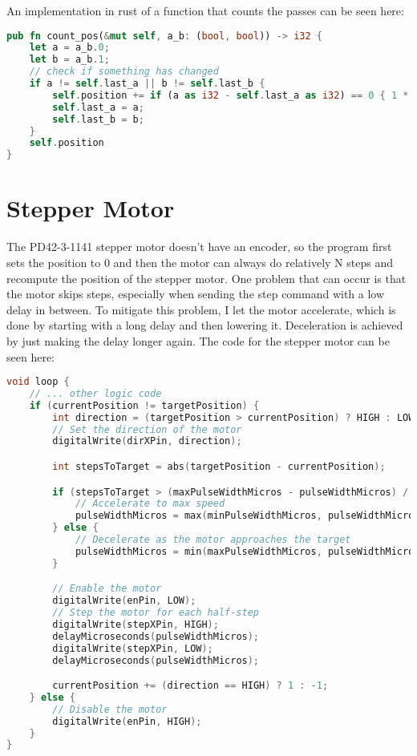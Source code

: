 An implementation in rust of a function that counts the passes can be seen here:
\begin{lstlisting}[language=rust,breaklines,label={lst:dc-motor}]
pub fn count_pos(&mut self, a_b: (bool, bool)) -> i32 {
    let a = a_b.0;
    let b = a_b.1;
    // check if something has changed
    if a != self.last_a || b != self.last_b {
        self.position += if (a as i32 - self.last_a as i32) == 0 { 1 * if a { 1 } else { -1 } * if (b as i32 - self.last_b as i32) == 1 { 1 } else { -1 } } else { - (1 * if b { 1 } else { -1 } * (a as i32 - self.last_a as i32))};
        self.last_a = a;
        self.last_b = b;
    }
    self.position
}

\end{lstlisting}


\section{Stepper Motor}\label{sec:stepper-motor}
The PD42-3-1141 stepper motor doesn't have an encoder, so the program first sets the position to 0 and then the motor can always do relatively N steps and recompute the position of the stepper motor.
One problem that can occur is that the motor skips steps, especially when sending the step command with a low delay in between.
To mitigate this problem, I let the motor accelerate, which is done by starting with a long delay and then lowering it.
Deceleration is achieved by just making the delay longer again.
The code for the stepper motor can be seen here:
\begin{lstlisting}[language=cpp,breaklines,label={lst:stepper-motor}]
void loop {
    // ... other logic code
    if (currentPosition != targetPosition) {
        int direction = (targetPosition > currentPosition) ? HIGH : LOW;
        // Set the direction of the motor
        digitalWrite(dirXPin, direction);

        int stepsToTarget = abs(targetPosition - currentPosition);

        if (stepsToTarget > (maxPulseWidthMicros - pulseWidthMicros) / acc) {
            // Accelerate to max speed
            pulseWidthMicros = max(minPulseWidthMicros, pulseWidthMicros - acc);
        } else {
            // Decelerate as the motor approaches the target
            pulseWidthMicros = min(maxPulseWidthMicros, pulseWidthMicros + acc);
        }

        // Enable the motor
        digitalWrite(enPin, LOW);
        // Step the motor for each half-step
        digitalWrite(stepXPin, HIGH);
        delayMicroseconds(pulseWidthMicros);
        digitalWrite(stepXPin, LOW);
        delayMicroseconds(pulseWidthMicros);

        currentPosition += (direction == HIGH) ? 1 : -1;
    } else {
        // Disable the motor
        digitalWrite(enPin, HIGH);
    }
}
\end{lstlisting}
